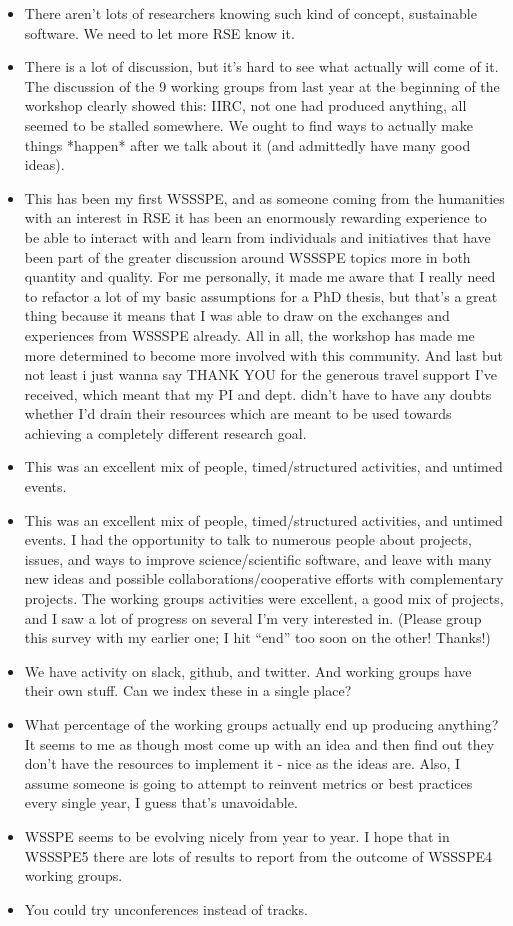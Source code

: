 \begin{itemize}
\item There aren't lots of researchers knowing such kind of concept, sustainable software. We need to let more RSE know it.
\item There is a lot of discussion, but it's hard to see what actually will come of it. The discussion of the 9 working groups from last year at the beginning of the workshop clearly showed this: IIRC, not one had produced anything, all seemed to be stalled somewhere. We ought to find ways to actually make things *happen* after we talk about it (and admittedly have many good ideas).
\item This has been my first WSSSPE, and as someone coming from the humanities with an interest in RSE it has been an enormously rewarding experience to be able to interact with and learn from individuals and initiatives that have been part of the greater discussion around WSSSPE topics more in both quantity and quality. For me personally, it made me aware that I really need to refactor a lot of my basic assumptions for a PhD thesis, but that's a great thing because it means that I was able to draw on the exchanges and experiences from WSSSPE already. All in all, the workshop has made me more determined to become more involved with this community. And last but not least i just wanna say THANK YOU for the generous travel support I've received, which meant that my PI and dept. didn't have to have any doubts whether I'd drain their resources which are meant to be used towards achieving a completely different research goal.
\item This was an excellent mix of people, timed/structured activities, and untimed events.
\item This was an excellent mix of people, timed/structured activities, and untimed events. I had the opportunity to talk to numerous people about projects, issues, and ways to improve science/scientific software, and leave with many new ideas and possible collaborations/cooperative efforts with complementary projects. The working groups activities were excellent, a good mix of projects, and I saw a lot of progress on several I'm very interested in. (Please group this survey with my earlier one; I hit ``end'' too soon on the other! Thanks!)
\item We have activity on slack, github, and twitter. And working groups have their own stuff. Can we index these in a single place?
\item What percentage of the working groups actually end up producing anything? It seems to me as though most come up with an idea and then find out they don't have the resources to implement it - nice as the ideas are. Also, I assume someone is going to attempt to reinvent metrics or best practices every single year, I guess that's unavoidable.
\item WSSPE seems to be evolving nicely from year to year.  I hope that in WSSSPE5 there are lots of results to report from the outcome of WSSSPE4 working groups.
\item You could try unconferences instead of tracks. 
\end{itemize}
